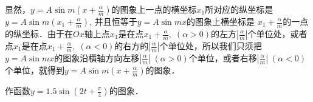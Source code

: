 显然，$y=A\sin m\left(x+\frac{\alpha}{m}\right)$的图象上一点的横坐标$x_1$所对应的纵坐标是$y=A\sin m\left(x_1+\frac{\alpha}{m}\right)$, 并且恒等于$y=A\sin mx$的图象上横坐标是
$x_1+\frac{\alpha}{m}$的一点的纵坐标．由于在$Ox$轴上点$x_1$是在点$x_1+\frac{\alpha}{m},\;(\alpha>0)$的左方$\left|\frac{\alpha}{m}\right|$个单位处，或者点$x_1$是在点$x_1+\frac{\alpha}{m},\;(\alpha<0)$的右方的$\left|\frac{\alpha}{m}\right|$个单位处，所以我们只须把
$y=A\sin mx$的图象沿横轴方向左移$\left|\frac{\alpha}{m}\right|\;(\alpha>0)$个单位，或者右移$\left|\frac{\alpha}{m}\right|\;(\alpha<0)$个单位，就得到$y=A\sin m\left(x+\frac{\alpha}{m}\right)$的图象．

\begin{example}
作函数$y=1.5\sin \left(2t+\frac{\pi}{4}\right)$的图象．
\end{example}


